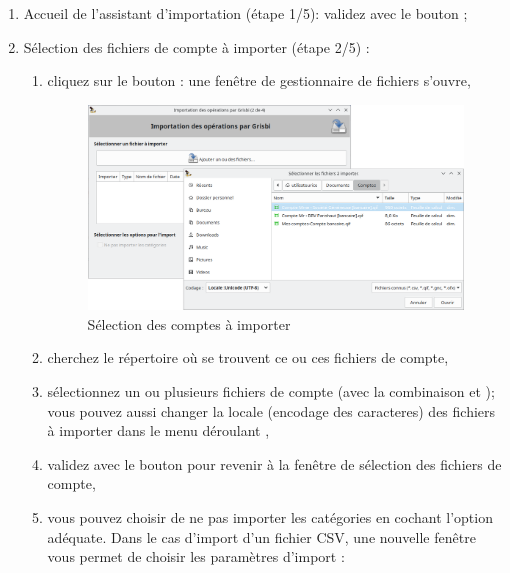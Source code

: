 \begin{enumerate}
	\item Accueil de l'assistant d'importation (étape 1/5): validez avec le bouton ;
	\item Sélection des fichiers de compte à importer (étape 2/5) :	
		\begin{enumerate}
			\item cliquez sur le bouton : une fenêtre de gestionnaire de fichiers s'ouvre,
			\begin{figure}[htbp]
				\raggedleft
					\includegraphics[width=.95\textwidth]{image/screenshot/importexport_import_files_select}
				\caption{Sélection des comptes à importer}
				\label{importexport-import-files-select-img}
			\end{figure}
			\item cherchez le répertoire où se trouvent ce ou ces fichiers de compte,
			\item sélectionnez un ou plusieurs fichiers de compte (avec la combinaison  et ); vous pouvez aussi changer la \gls{locale} (\gls{encodage des caracteres}) des fichiers à importer dans le menu déroulant ,
			\item validez avec le bouton  pour revenir à la fenêtre de sélection des fichiers de compte,
			\item vous pouvez choisir de ne pas importer les catégories en cochant l'option adéquate. Dans le cas d'import d'un fichier \gls{CSV}, une nouvelle fenêtre vous permet de choisir les paramètres d'import :
				\begin{itemize}[label=\textopenbullet]

\end{itemize}
\end{enumerate}
\end{enumerate}
